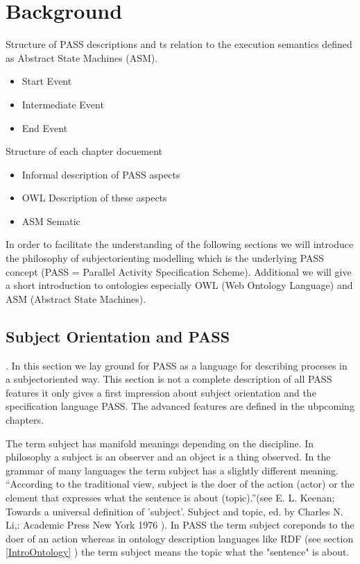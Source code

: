 \chapter{Background}
Structure of PASS descriptions and ts relation to the execution semantics defined as Abstract State Machines (ASM).

\begin{itemize}
	\item Start Event
	\item Intermediate Event
	\item End Event
\end{itemize}


Structure of each chapter docuement
\begin{itemize}
	\item Informal description of PASS aspects
	\item OWL Description of these aspects
	\item ASM Sematic
\end{itemize}



In order to facilitate the understanding of the following sections we will introduce the philosophy of subjectorienting modelling which is the underlying PASS concept (PASS = Parallel Activity Specification Scheme). Additional we will give a short introduction to ontologies especially OWL (Web Ontology Language) and ASM (Abstract State Machines).



\section{Subject Orientation and PASS }
\label{SubjectOrient}.
In this section we lay ground for PASS as a language for describing proceses in a subjectoriented way. This section is not a complete description of all PASS features it only gives a first impression about subject orientation and the specification language PASS. The advanced features are defined in the ubpcoming chapters.

The term subject has manifold meanings depending on the discipline. In philosophy a subject is an observer and an object is a thing observed. In the grammar of many languages the term subject has a slightly different meaning. “According to the traditional view, subject is the doer of the action (actor) or the element that expresses what the sentence is about (topic).”(see E. L. Keenan; Towards a universal definition of 'subject'. Subject and topic, ed. by  Charles N. Li,: Academic Press New York 1976 ). In PASS the term subject coreponds to the doer of an action whereas in ontology description languages like RDF (see section \ref{IntroOntology} ) the term subject means the topic what the "sentence" is about.


